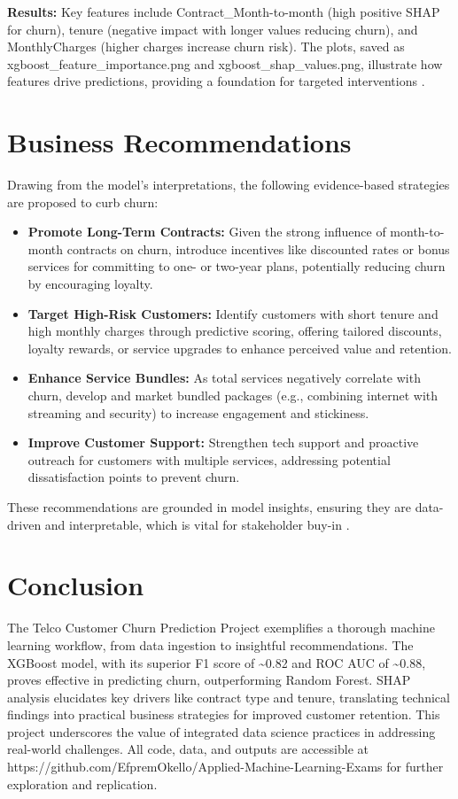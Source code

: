 \documentclass[preprint, 3p,
authoryear]{elsarticle} %
\begin{document}
\textbf{Results:} Key features include Contract\_Month-to-month (high
positive SHAP for churn), tenure (negative impact with longer values
reducing churn), and MonthlyCharges (higher charges increase churn
risk). The plots, saved as xgboost\_feature\_importance.png and
xgboost\_shap\_values.png, illustrate how features drive predictions,
providing a foundation for targeted interventions
\citep{sindhgatta2020exploring}.

\section{Business Recommendations}\label{business-recommendations}

Drawing from the model's interpretations, the following evidence-based
strategies are proposed to curb churn:

\begin{itemize}
\item
  \textbf{Promote Long-Term Contracts:} Given the strong influence of
  month-to-month contracts on churn, introduce incentives like
  discounted rates or bonus services for committing to one- or two-year
  plans, potentially reducing churn by encouraging loyalty.
\item
  \textbf{Target High-Risk Customers:} Identify customers with short
  tenure and high monthly charges through predictive scoring, offering
  tailored discounts, loyalty rewards, or service upgrades to enhance
  perceived value and retention.
\item
  \textbf{Enhance Service Bundles:} As total services negatively
  correlate with churn, develop and market bundled packages (e.g.,
  combining internet with streaming and security) to increase engagement
  and stickiness.
\item
  \textbf{Improve Customer Support:} Strengthen tech support and
  proactive outreach for customers with multiple services, addressing
  potential dissatisfaction points to prevent churn.
\end{itemize}

These recommendations are grounded in model insights, ensuring they are
data-driven and interpretable, which is vital for stakeholder buy-in
\citep{sindhgatta2020exploring}.

\section{Conclusion}\label{conclusion}

The Telco Customer Churn Prediction Project exemplifies a thorough
machine learning workflow, from data ingestion to insightful
recommendations. The XGBoost model, with its superior F1 score of
\textasciitilde0.82 and ROC AUC of \textasciitilde0.88, proves effective
in predicting churn, outperforming Random Forest. SHAP analysis
elucidates key drivers like contract type and tenure, translating
technical findings into practical business strategies for improved
customer retention. This project underscores the value of integrated
data science practices in addressing real-world challenges. All code,
data, and outputs are accessible at
https://github.com/EfpremOkello/Applied-Machine-Learning-Exams for
further exploration and replication.

\renewcommand\refname{References}

\end{document}
